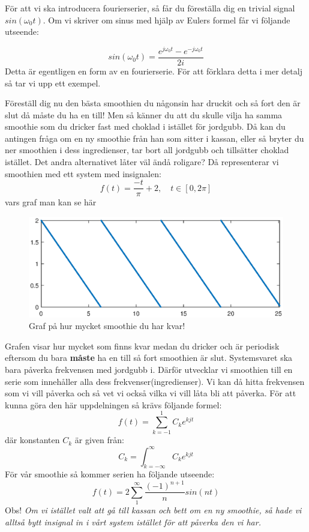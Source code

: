 \documentclass{article}
\begin{document}
För att vi ska introducera fourierserier, så får du föreställa dig en trivial signal $sin(\omega_0 t)$. Om vi skriver om sinus med hjälp av Eulers formel får vi följande utseende:

\[sin(\omega_0 t) = \frac{e^{j \omega_0 t}  - e^{-j \omega_0 t}}{2i}\]
Detta är egentligen en form av en fourierserie. För att förklara detta i mer detalj så tar vi upp ett exempel.

Föreställ dig nu den bästa smoothien du någonsin har druckit och så fort den är slut då måste du ha en till! Men så känner du att du skulle vilja ha samma smoothie som du dricker fast med choklad i istället för jordgubb. Då kan du antingen fråga om en ny smoothie från han som sitter i kassan, eller så bryter du ner smoothien i dess ingredienser, tar bort all jordgubb och tillsätter choklad istället. Det andra alternativet låter väl ändå roligare? 
Då representerar vi smoothien med ett system med insignalen:
\[ f(t) = \frac{-t}{\pi} + 2, \quad t \in [0,2 \pi] \]
vars graf man kan se här %
\begin{figure}[ht]
\centerline{\includegraphics[scale=0.55]{smoothie.eps}}
\caption{Graf på hur mycket smoothie du har kvar!}
\label{}
\end{figure}
Grafen visar hur mycket som finns kvar medan du dricker och är periodisk eftersom du bara \textbf{måste} ha en till så fort smoothien är slut. Systemsvaret ska bara påverka frekvensen med jordgubb i. Därför utvecklar vi smoothien till en serie som innehåller alla dess frekvenser(ingredienser). Vi kan då hitta frekvensen som vi vill påverka och så vet vi också vilka vi vill låta bli att påverka. För att kunna göra den här uppdelningen så krävs följande formel:
\[ f(t) = \sum_{k=-1}^1 C_k e^{k j t} \]
där konstanten $C_k$ är given från:
\[C_k = \int_{k=-\infty}^{\infty} C_k e^{k j t}\] 
För vår smoothie så kommer serien ha följande utseende:
\[f(t) = 2 \sum_{1}^{\infty} \frac{(-1)^{n+1}}{n} sin(n t) \]
Obs! \emph{Om vi istället valt att gå till kassan och bett om en ny smoothie, så hade vi alltså bytt insignal in i vårt system istället för att påverka den vi har.}
\end{document}
